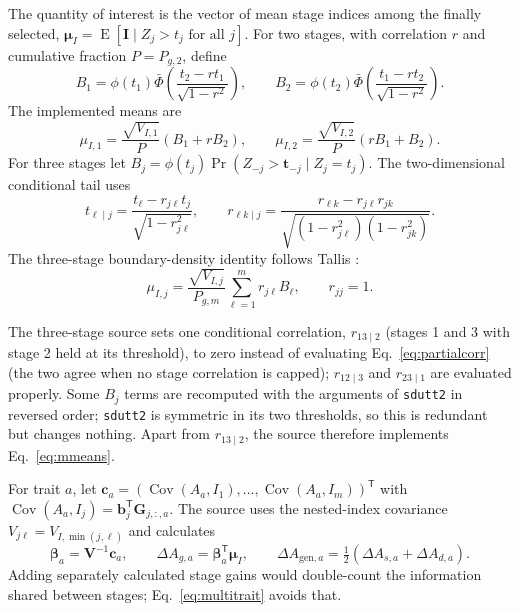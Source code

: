 \documentclass[11pt]{article}
\newcommand{\src}[1]{\texttt{#1}}
\newcommand{\Cov}{\operatorname{Cov}}
\newcommand{\E}{\operatorname{E}}
\newcommand{\ve}[1]{\boldsymbol{#1}}
\newcommand{\ma}[1]{\mathbf{#1}}
\begin{document}
The quantity of interest is the vector of mean stage indices among the finally selected, $\ve\mu_I=\E[\ve I\mid Z_j>t_j\text{ for all }j]$. For two stages, with correlation $r$ and cumulative fraction $P=P_{g,2}$, define
\begin{equation}\label{eq:twoboundaries}
B_1=\phi(t_1)\bar\Phi\left(\frac{t_2-rt_1}{\sqrt{1-r^2}}\right),\qquad
B_2=\phi(t_2)\bar\Phi\left(\frac{t_1-rt_2}{\sqrt{1-r^2}}\right).
\end{equation}
The implemented means are
\begin{equation}\label{eq:twomeans}
\mu_{I,1}=\frac{\sqrt{V_{I,1}}}{P}(B_1+rB_2),\qquad
\mu_{I,2}=\frac{\sqrt{V_{I,2}}}{P}(rB_1+B_2).
\end{equation}
For three stages let $B_j=\phi(t_j)\Pr(Z_{-j}>\ve t_{-j}\mid Z_j=t_j)$. The two-dimensional conditional tail uses
\begin{equation}\label{eq:partialcorr}
t_{\ell\mid j}=\frac{t_\ell-r_{j\ell}t_j}{\sqrt{1-r_{j\ell}^2}},\qquad
r_{\ell k\mid j}=
\frac{r_{\ell k}-r_{j\ell}r_{jk}}
{\sqrt{(1-r_{j\ell}^2)(1-r_{jk}^2)}}.
\end{equation}
The three-stage boundary-density identity follows Tallis \cite{tallis1961}:
\begin{equation}\label{eq:mmeans}
\mu_{I,j}=\frac{\sqrt{V_{I,j}}}{P_{g,m}}\sum_{\ell=1}^{m}r_{j\ell}B_\ell,\qquad r_{jj}=1.
\end{equation}

\begin{codenote}
The three-stage source sets one conditional correlation, $r_{13\mid2}$ (stages 1 and 3 with stage 2 held at its threshold), to zero instead of evaluating Eq.~\eqref{eq:partialcorr} (the two agree when no stage correlation is capped); $r_{12\mid3}$ and $r_{23\mid1}$ are evaluated properly. Some $B_j$ terms are recomputed with the arguments of \src{sdutt2} in reversed order; \src{sdutt2} is symmetric in its two thresholds, so this is redundant but changes nothing. Apart from $r_{13\mid2}$, the source therefore implements Eq.~\eqref{eq:mmeans}.
\end{codenote}

For trait $a$, let $\ve c_a=(\Cov(A_a,I_1),\ldots,\Cov(A_a,I_m))^{\mathsf T}$ with $\Cov(A_a,I_j)=\ve b_j^{\mathsf T}\ma G_{j,:,a}$. The source uses the nested-index covariance $V_{j\ell}=V_{I,\min(j,\ell)}$ and calculates
\begin{equation}\label{eq:multitrait}
\ve\beta_a=\ma V^{-1}\ve c_a,\qquad
\Delta A_{g,a}=\ve\beta_a^{\mathsf T}\ve\mu_I,\qquad
\Delta A_{\mathrm{gen},a}=\tfrac12(\Delta A_{s,a}+\Delta A_{d,a}).
\end{equation}
Adding separately calculated stage gains would double-count the information shared between stages; Eq.~\eqref{eq:multitrait} avoids that.
\end{document}
